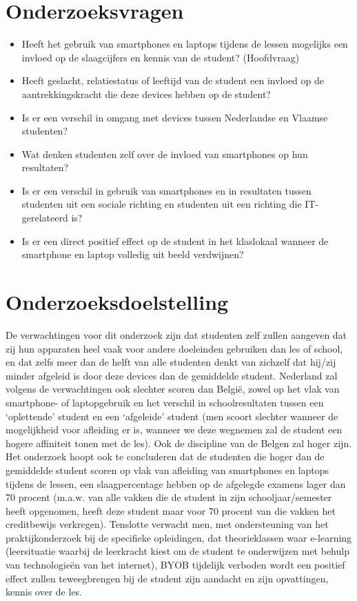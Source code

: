 \section{Onderzoeksvragen}
\label{sec:onderzoeksvragen}

\begin{itemize}
	\item Heeft het gebruik van smartphones en laptops tijdens de lessen mogelijks een invloed op de slaagcijfers en kennis van de student? (Hoofdvraag)
	\item Heeft geslacht, relatiestatus of leeftijd van de student een invloed op de aantrekkingskracht die deze devices hebben op de student?
	\item Is er een verschil in omgang met devices tussen Nederlandse en Vlaamse studenten?
	\item Wat denken studenten zelf over de invloed van smartphones op hun resultaten?
	\item Is er een verschil in gebruik van smartphones en in resultaten tussen studenten uit een sociale richting en studenten uit een richting die IT-gerelateerd is?
	\item Is er een direct positief effect op de student in het klaslokaal wanneer de smartphone en laptop volledig uit beeld verdwijnen?
\end{itemize}

\section{Onderzoeksdoelstelling}
\label{sec:onderzoeksdoelstelling}

De verwachtingen voor dit onderzoek zijn dat studenten zelf zullen aangeven dat zij hun apparaten heel vaak voor andere doeleinden gebruiken dan les of school, en dat zelfs meer dan de helft van alle studenten denkt van zichzelf dat hij/zij minder afgeleid is door deze devices dan de gemiddelde student. Nederland zal volgens de verwachtingen ook slechter scoren dan België, zowel op het vlak van smartphone- of laptopgebruik en het verschil in schoolresultaten tussen een ‘oplettende’ student en een ‘afgeleide’ student (men scoort slechter wanneer de mogelijkheid voor afleiding er is, wanneer we deze wegnemen zal de student een hogere affiniteit tonen met de les). Ook de discipline van de Belgen zal hoger zijn. Het onderzoek hoopt ook te concluderen dat de studenten die hoger dan de gemiddelde student scoren op vlak van afleiding van smartphones en laptops tijdens de lessen, een slaagpercentage hebben op de afgelegde examens lager dan 70 procent (m.a.w. van alle vakken die de student in zijn schooljaar/semester heeft opgenomen, heeft deze student maar voor 70 procent van die vakken het creditbewijs verkregen). Tenslotte verwacht men, met ondersteuning van het praktijkonderzoek bij de specifieke opleidingen, dat theorieklassen waar e-learning (leersituatie waarbij de leerkracht kiest om de student te onderwijzen met behulp van technologieën van het internet), BYOB tijdelijk verboden wordt een positief effect zullen teweegbrengen bij de student zijn aandacht en zijn opvattingen, kennis over de les.

